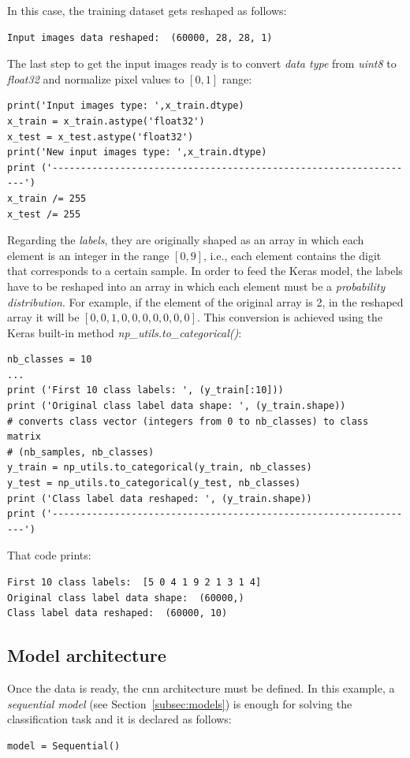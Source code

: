 In this case, the training dataset gets reshaped as follows:
\begin{Verbatim}[frame=single]
Input images data reshaped:  (60000, 28, 28, 1)
\end{Verbatim}

The last step to get the input images ready is to convert \emph{data type} from \textit{uint8} to \textit{float32} and normalize pixel values to $[0,1]$ range:
\begin{lstlisting}
print('Input images type: ',x_train.dtype)
x_train = x_train.astype('float32')
x_test = x_test.astype('float32')
print('New input images type: ',x_train.dtype)
print ('-----------------------------------------------------------------')
x_train /= 255
x_test /= 255
\end{lstlisting}

Regarding the \emph{labels}, they are originally shaped as an array in which each element is an integer in the range $[0, 9]$, i.e., each element contains the digit that corresponds to a certain sample. In order to feed the Keras model, the labels have to be reshaped into an array in which each element must be a \emph{probability distribution}. For example, if the element of the original array is 2, in the reshaped array it will be $[0, 0, 1, 0, 0, 0, 0, 0, 0, 0]$. This conversion is achieved using the Keras built-in method \emph{\textit{np\_utils.to\_categorical()}}:
\begin{lstlisting}
nb_classes = 10
...
print ('First 10 class labels: ', (y_train[:10]))
print ('Original class label data shape: ', (y_train.shape))
# converts class vector (integers from 0 to nb_classes) to class matrix
# (nb_samples, nb_classes)
y_train = np_utils.to_categorical(y_train, nb_classes)
y_test = np_utils.to_categorical(y_test, nb_classes)
print ('Class label data reshaped: ', (y_train.shape))
print ('-----------------------------------------------------------------')
\end{lstlisting}

That code prints:
\begin{Verbatim}[frame=single]
First 10 class labels:  [5 0 4 1 9 2 1 3 1 4]
Original class label data shape:  (60000,)
Class label data reshaped:  (60000, 10)
\end{Verbatim}

\subsection{Model architecture}
Once the data is ready, the \gls{cnn} architecture must be defined. In this example, a \emph{sequential model} (see Section~\ref{subsec:models}) is enough for solving the classification task and it is declared as follows:
\begin{lstlisting}
model = Sequential()
\end{lstlisting}

